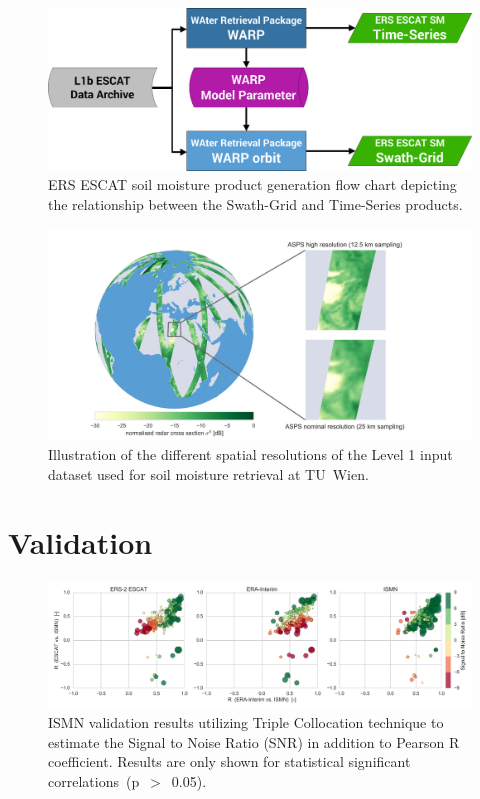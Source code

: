 \documentclass[a4paper,twocolumn]{esapub2005} %
\begin{document}
\begin{figure}
  \centering
  \includegraphics[width=1.\linewidth]{../poster/figures/WARP_WARPNRT.pdf}
  \caption{ERS ESCAT soil moisture product generation flow chart depicting the relationship between the Swath-Grid and Time-Series products.\label{figure:escat_products}}
\end{figure}

\begin{figure}
  \centering
  \includegraphics[width=0.9\linewidth]{../poster/figures/ASPS_resolutions.png}
  \caption{Illustration of the different spatial resolutions of the Level 1 input dataset used for soil moisture retrieval at TU~Wien.\label{figure:spat_res}}
\end{figure}


\section{Validation}

\begin{figure}
  \centering
  \includegraphics[width=1.\linewidth]{../poster/figures/TripleCol_SNR_R.png}
  \caption{ISMN validation results utilizing Triple Collocation technique to estimate the Signal to Noise Ratio (SNR) in addition to Pearson R coefficient. Results are only shown for statistical significant correlations~(p~$>$~0.05).\label{figure:ismn_val}}
\end{figure}
\end{document}
